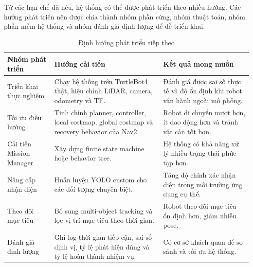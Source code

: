 Từ các hạn chế đã nêu, hệ thống có thể được phát triển theo nhiều hướng. Các hướng phát triển nên được chia thành nhóm phần cứng, nhóm thuật toán, nhóm phần mềm hệ thống và nhóm đánh giá định lượng để dễ triển khai.

\begin{table}[H]
    \centering
    \caption{Định hướng phát triển tiếp theo}
    \label{tab:future-directions}
    \renewcommand{\arraystretch}{1.25}
    \small
    \begin{tabularx}{\textwidth}{|>{\raggedright\arraybackslash}p{}|>{\raggedright\arraybackslash}p{}|>{\raggedright\arraybackslash}X|}
        \hline
        \textbf{Nhóm phát triển} & \textbf{Hướng cải tiến} & \textbf{Kết quả mong muốn} \\
        \hline
        Triển khai thực nghiệm & Chạy hệ thống trên TurtleBot4 thật, hiệu chỉnh LiDAR, camera, odometry và TF. & Đánh giá được sai số thực tế và độ ổn định khi robot vận hành ngoài mô phỏng. \\
        \hline
        Tối ưu điều hướng & Tinh chỉnh planner, controller, local costmap, global costmap và recovery behavior của Nav2. & Robot di chuyển mượt hơn, ít dao động hơn và tránh vật cản tốt hơn. \\
        \hline
        Cải tiến Mission Manager & Xây dựng finite state machine hoặc behavior tree. & Hệ thống có khả năng xử lý nhiều trạng thái phức tạp hơn. \\
        \hline
        Nâng cấp nhận diện & Huấn luyện YOLO custom cho các đối tượng chuyên biệt. & Tăng độ chính xác nhận diện trong môi trường ứng dụng cụ thể. \\
        \hline
        Theo dõi mục tiêu & Bổ sung multi-object tracking và lọc vị trí mục tiêu theo thời gian. & Robot theo dõi mục tiêu ổn định hơn, giảm nhiễu pose. \\
        \hline
        Đánh giá định lượng & Ghi log thời gian tiếp cận, sai số định vị, tỷ lệ phát hiện đúng và tỷ lệ hoàn thành nhiệm vụ. & Có cơ sở khách quan để so sánh và tối ưu hệ thống. \\
        \hline
    \end{tabularx}
\end{table}

